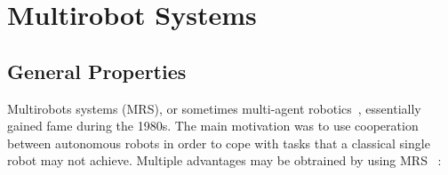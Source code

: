 \section{Multirobot Systems}
\label{sec:MRS}

  






  \subsection{General Properties} 

    Multirobots systems (MRS), or sometimes multi-agent robotics~\parencite{Dudek1996}, essentially gained fame during the 1980s. The main motivation was to use cooperation between autonomous robots in order to cope with tasks that a classical single robot may not achieve. Multiple advantages may be obtrained by using MRS~\parencite{Cao1997, Arkin1998} :

